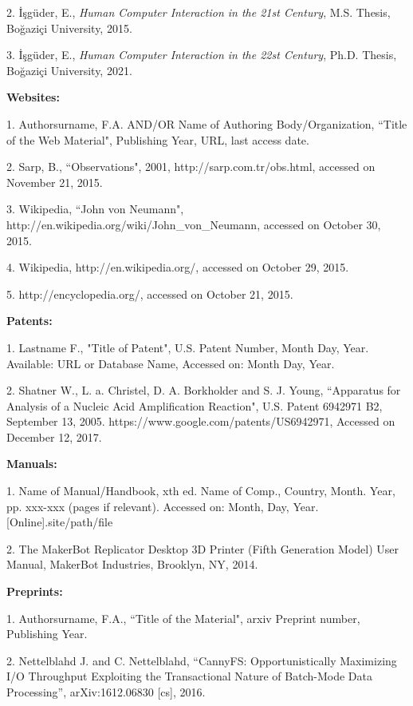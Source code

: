 \documentclass[a4paper,oneside,12pt]{report}
\numberwithin{equation}{chapter}
\begin{document}
\begin{flushleft}
\leftskip 5mm \parindent -5mm 2. İşgüder, E., \textit{Human Computer Interaction in the 21st Century}, M.S. Thesis, Boğaziçi University, 2015.

\leftskip 5mm \parindent -5mm 3. İşgüder, E., \textit{Human Computer Interaction in the 22st Century}, Ph.D. Thesis, Boğaziçi University, 2021.\newline


\leftskip 5mm \parindent -5mm \textbf{Websites:}

\leftskip 5mm \parindent -5mm 1. Authorsurname, F.A. AND/OR Name of Authoring Body/Organization, ``Title of the Web Material", Publishing Year, URL, last access date.

\leftskip 5mm \parindent -5mm 2. Sarp, B., ``Observations", 2001, http://sarp.com.tr/obs.html, accessed on November 21, 2015.

\leftskip 5mm \parindent -5mm 3. Wikipedia, ``John von Neumann", http://en.wikipedia.org/wiki/John\_von\_Neumann, accessed on October 30, 2015.

\leftskip 5mm \parindent -5mm 4. Wikipedia, http://en.wikipedia.org/, accessed on October 29, 2015.

\leftskip 5mm \parindent -5mm 5. http://encyclopedia.org/, accessed on October 21, 2015.\newline

\clearpage
\leftskip 5mm \parindent -5mm \textbf{Patents:}

\leftskip 5mm \parindent -5mm 1. Lastname F., "Title of Patent", U.S. Patent Number, Month Day, Year. Available: URL or Database Name, Accessed on: Month Day, Year.

\leftskip 5mm \parindent -5mm 2. Shatner W., L. a. Christel, D. A. Borkholder and S. J. Young, ``Apparatus for Analysis of a Nucleic Acid Amplification Reaction", U.S. Patent 6942971 B2, September 13, 2005. https://www.google.com/patents/US6942971, Accessed on December 12, 2017.\newline


\leftskip 5mm \parindent -5mm \textbf{Manuals:}

\leftskip 5mm \parindent -5mm 1. Name of Manual/Handbook, xth ed. Name of Comp.,  Country, Month. Year, pp. xxx-xxx (pages if relevant). Accessed on: Month, Day, Year. [Online].site/path/file 

\leftskip 5mm \parindent -5mm 2. The MakerBot Replicator Desktop 3D Printer (Fifth Generation Model) User Manual, MakerBot Industries, Brooklyn, NY, 2014.\newline


\leftskip 5mm \parindent -5mm \textbf{Preprints:}

\leftskip 5mm \parindent -5mm 1. Authorsurname, F.A., ``Title of the 
Material", arxiv Preprint number, Publishing Year.

\leftskip 5mm \parindent -5mm 2. Nettelblahd J. and C. Nettelblahd, “CannyFS: Opportunistically Maximizing I/O Throughput Exploiting the Transactional Nature of Batch-Mode Data Processing”, arXiv:1612.06830 [cs], 2016.\newline
\end{flushleft}
\end{document}
